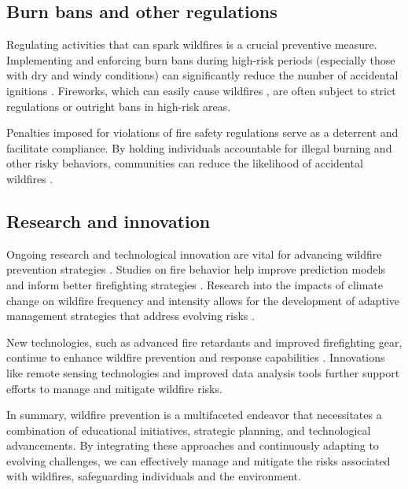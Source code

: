 \documentclass[
  12 pt,
]{Nemilov}
\begin{document}
\subsection{Burn bans and other regulations}\label{burn-bans-and-other-regulations}

Regulating activities that can spark wildfires is a crucial preventive measure. Implementing and enforcing burn bans during high-risk periods (especially those with dry and windy conditions) can significantly reduce the number of accidental ignitions \citep{hoang2013statewide}. Fireworks, which can easily cause wildfires \citep{vachula2023timing}, are often subject to strict regulations or outright bans in high-risk areas.

Penalties imposed for violations of fire safety regulations serve as a deterrent and facilitate compliance. By holding individuals accountable for illegal burning and other risky behaviors, communities can reduce the likelihood of accidental wildfires \citep{chas2015human}.

\subsection{Research and innovation}\label{research-and-innovation}

Ongoing research and technological innovation are vital for advancing wildfire prevention strategies \citep{xu2024wildfire}. Studies on fire behavior help improve prediction models and inform better firefighting strategies \citep{albini1976estimating}. Research into the impacts of climate change on wildfire frequency and intensity allows for the development of adaptive management strategies that address evolving risks \citep{dupuy2020climate, williams2019observed}.

New technologies, such as advanced fire retardants and improved firefighting gear, continue to enhance wildfire prevention and response capabilities \citep{carballo2017impact, lu2023dropping}. Innovations like remote sensing technologies and improved data analysis tools further support efforts to manage and mitigate wildfire risks.

In summary, wildfire prevention is a multifaceted endeavor that necessitates a combination of educational initiatives, strategic planning, and technological advancements. By integrating these approaches and continuously adapting to evolving challenges, we can effectively manage and mitigate the risks associated with wildfires, safeguarding individuals and the environment.
\end{document}
